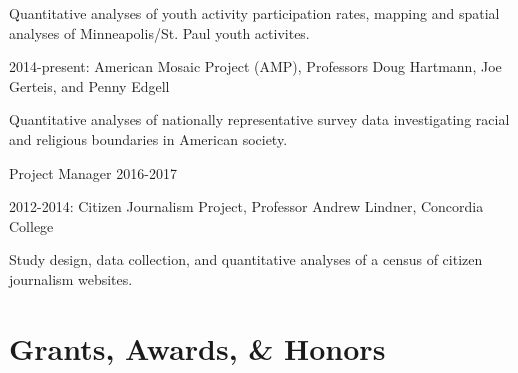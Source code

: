 \documentclass[letterpaper]{article}
\renewenvironment{itemize}{
  \begin{list}{}{
    \setlength{\leftmargin}{1.5em}
  }
}{
  \end{list}
}
\begin{document}
\begin{itemize}
\begin{itemize}
	\item Quantitative analyses of youth activity participation rates, mapping and spatial analyses of Minneapolis/St. Paul youth activites.
	\end{itemize}
\item 2014-present: American Mosaic Project (AMP), Professors Doug Hartmann, Joe Gerteis, and Penny Edgell
	\begin{itemize}
	\item Quantitative analyses of nationally representative survey data investigating racial and religious boundaries in American society. 
	\item Project Manager 2016-2017
	\end{itemize}
\item 2012-2014: Citizen Journalism Project, Professor Andrew Lindner, Concordia College
	\begin{itemize}
	\item Study design, data collection, and quantitative analyses of a census of citizen journalism websites.
	\end{itemize}
\end{itemize}



\section*{\textbf{Grants, Awards, \& Honors}}
\end{document}
